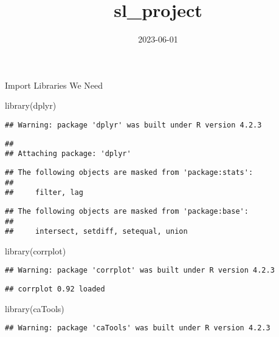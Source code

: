 \documentclass[
]{article}
\title{sl\_project}
\author{}
\date{\vspace{-2.5em}2023-06-01}
\newenvironment{Shaded}{\begin{snugshade}}{\end{snugshade}}
\newcommand{\FunctionTok}[1]{\textcolor[rgb]{0.00,0.00,0.00}{#1}}
\newcommand{\NormalTok}[1]{#1}
\begin{document}
\maketitle

Import Libraries We Need

\begin{Shaded}
\begin{Highlighting}[]
\FunctionTok{library}\NormalTok{(dplyr)}
\end{Highlighting}
\end{Shaded}

\begin{verbatim}
## Warning: package 'dplyr' was built under R version 4.2.3
\end{verbatim}

\begin{verbatim}
## 
## Attaching package: 'dplyr'
\end{verbatim}

\begin{verbatim}
## The following objects are masked from 'package:stats':
## 
##     filter, lag
\end{verbatim}

\begin{verbatim}
## The following objects are masked from 'package:base':
## 
##     intersect, setdiff, setequal, union
\end{verbatim}

\begin{Shaded}
\begin{Highlighting}[]
\FunctionTok{library}\NormalTok{(corrplot)}
\end{Highlighting}
\end{Shaded}

\begin{verbatim}
## Warning: package 'corrplot' was built under R version 4.2.3
\end{verbatim}

\begin{verbatim}
## corrplot 0.92 loaded
\end{verbatim}

\begin{Shaded}
\begin{Highlighting}[]
\FunctionTok{library}\NormalTok{(caTools)}
\end{Highlighting}
\end{Shaded}

\begin{verbatim}
## Warning: package 'caTools' was built under R version 4.2.3
\end{verbatim}
\end{document}
